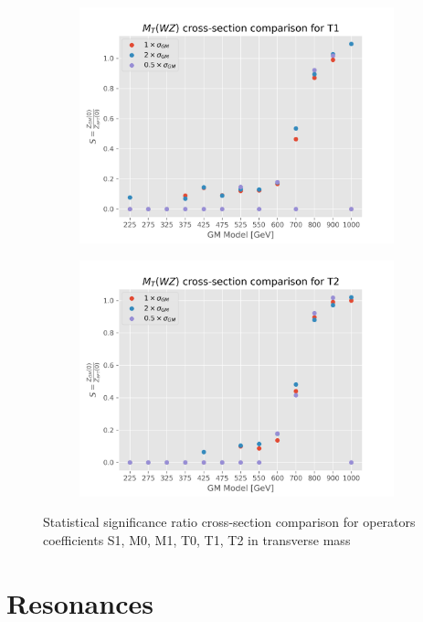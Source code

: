 \documentclass[../Bachelorarbeit.tex]{subfiles}
\begin{document}
\begin{figure}[h]
\begin{subfigure}{0.45\textwidth}
        \includegraphics[width=\textwidth]{Plots/gm_relevanze/MTWZ_comparision_T1.png}
    \end{subfigure}
    \begin{subfigure}{0.45\textwidth}
        \includegraphics[width=\textwidth]{Plots/gm_relevanze/MTWZ_comparision_T2.png}
    \end{subfigure}
    \caption{Statistical significance ratio cross-section comparison for operators coefficients S1, M0, M1, T0, T1, T2 in transverse mass}
\end{figure}

\section{Resonances}
\label{sec:further_resonace}
\end{document}
